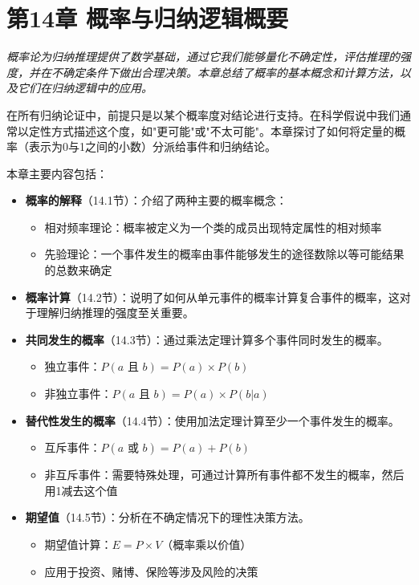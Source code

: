 \section{第14章 概率与归纳逻辑概要}

\begin{logicbox}[title=引言]
\textit{概率论为归纳推理提供了数学基础，通过它我们能够量化不确定性，评估推理的强度，并在不确定条件下做出合理决策。本章总结了概率的基本概念和计算方法，以及它们在归纳逻辑中的应用。}
\end{logicbox}

在所有归纳论证中，前提只是以某个概率度对结论进行支持。在科学假说中我们通常以定性方式描述这个度，如"更可能"或"不太可能"。本章探讨了如何将定量的概率（表示为0与1之间的小数）分派给事件和归纳结论。

本章主要内容包括：

\begin{itemize}
\item \textbf{概率的解释}（14.1节）：介绍了两种主要的概率概念：
  \begin{itemize}
  \item 相对频率理论：概率被定义为一个类的成员出现特定属性的相对频率
  \item 先验理论：一个事件发生的概率由事件能够发生的途径数除以等可能结果的总数来确定
  \end{itemize}

\item \textbf{概率计算}（14.2节）：说明了如何从单元事件的概率计算复合事件的概率，这对于理解归纳推理的强度至关重要。

\item \textbf{共同发生的概率}（14.3节）：通过乘法定理计算多个事件同时发生的概率。
  \begin{itemize}
  \item 独立事件：$P(a \text{ 且 } b) = P(a) \times P(b)$
  \item 非独立事件：$P(a \text{ 且 } b) = P(a) \times P(b|a)$
  \end{itemize}

\item \textbf{替代性发生的概率}（14.4节）：使用加法定理计算至少一个事件发生的概率。
  \begin{itemize}
  \item 互斥事件：$P(a \text{ 或 } b) = P(a) + P(b)$
  \item 非互斥事件：需要特殊处理，可通过计算所有事件都不发生的概率，然后用1减去这个值
  \end{itemize}

\item \textbf{期望值}（14.5节）：分析在不确定情况下的理性决策方法。
  \begin{itemize}
  \item 期望值计算：$E = P \times V$（概率乘以价值）
  \item 应用于投资、赌博、保险等涉及风险的决策
  \end{itemize}
\end{itemize}

